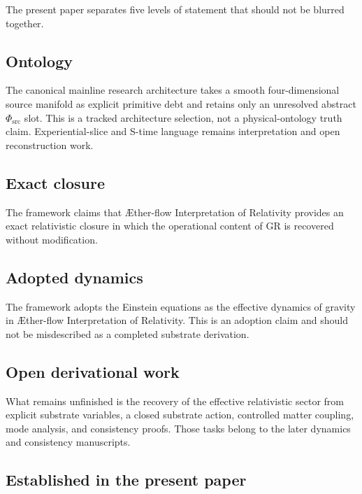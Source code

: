 \documentclass[11pt]{article}
\newcommand{\Aflow}{\AE{}ther-flow}
\newcommand{\TheoryName}{\Aflow{} Interpretation of Relativity}
\newcommand{\PhiSrc}{\Phi_{\mathrm{src}}}
\begin{document}
The present paper separates five levels of statement that should not be blurred together.

\subsection{Ontology}

The canonical mainline research architecture takes a smooth
four-dimensional source manifold as explicit primitive debt and retains only
an unresolved abstract \(\PhiSrc\) slot. This is a tracked architecture
selection, not a physical-ontology truth claim. Experiential-slice and S-time
language remains interpretation and open reconstruction work.

\subsection{Exact closure}

The framework claims that \TheoryName{} provides an exact relativistic closure in which the operational content of GR is recovered without modification.

\subsection{Adopted dynamics}

The framework adopts the Einstein equations as the effective dynamics of gravity in \TheoryName{}. This is an adoption claim and should not be misdescribed as a completed substrate derivation.

\subsection{Open derivational work}

What remains unfinished is the recovery of the effective relativistic sector from explicit substrate variables, a closed substrate action, controlled matter coupling, mode analysis, and consistency proofs. Those tasks belong to the later dynamics and consistency manuscripts.

\subsection{Established in the present paper}
\end{document}
